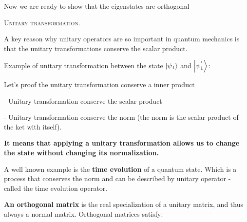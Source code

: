 \documentclass{article}
\begin{document}
Now we are ready to show that the eigenstates are orthogonal


\skl
\skl
\textsc{Unitary transformation.}


A key reason why unitary operators are so important in quantum mechanics is that the unitary transformations conserve the scalar product.

Example of unitary transformation between the state $\ket{\psi_1}$ and $\ket{\psi_1^{'}}$:


Let's proof the unitary transformation conserve a inner product


- Unitary transformation conserve the scalar product

- Unitary transformation conserve the norm (the norm is the scalar product of the ket with itself).

\textbf{It means that applying a unitary transformation allows us to change the state without changing its normalization.}

A well known example is the \textbf{time evolution} of a quantum state. Which is a process that conserves the norm and can be described by unitary operator - called the time evolution operator.


\textbf{An orthogonal matrix} is the real specialization of a unitary matrix, and thus always a normal matrix.
Orthogonal matrices satisfy:
\end{document}
